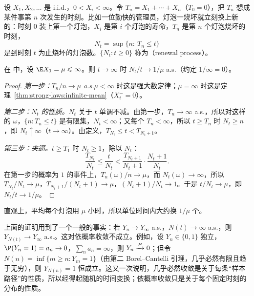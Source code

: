 
\begin{example}[更新过程]\label{ex:strong-laws:renewal}
设 $X_1,X_2,\dots$ 是 i.i.d.，$0<X_i<\infty$。令 $T_n=X_1+\cdots+X_n$（$T_0=0$），把 $T_n$ 想成某件事第 $n$ 次发生的时刻。比如一位勤快的管理员，灯泡一烧坏就立刻换上新的：时刻 $0$ 装上第一个灯泡，$X_i$ 是第 $i$ 个灯泡的寿命，$T_n$ 是第 $n$ 个灯泡烧坏的时刻，
\[
N_t=\sup\{n:\ T_n\leqslant t\}
\]
是到时刻 $t$ 为止烧坏的灯泡数。$\{N_t:t\geqslant0\}$ 称为（renewal process）。
\end{example}

\begin{theorem}[更新定理]\label{thm:strong-laws:renewal}
在 中，设 $\E X_1=\mu\leqslant\infty$。则 $t\to\infty$ 时 $N_t/t\to1/\mu$ a.s.（约定 $1/\infty=0$）。
\end{theorem}
\begin{proof}
\emph{第一步：$T_n/n\to\mu$ a.s.}$\mu<\infty$ 时这是强大数定律；$\mu=\infty$ 时这是定理~\ref{thm:strong-laws:infinite-mean}（$X_i^-=0$）。

\emph{第二步：$N_t$ 的性质。}$N_t$ 关于 $t$ 单调不减。由第一步，$T_n\to\infty$ a.s.，所以对这样的 $\omega$，$\{n:T_n\leqslant t\}$ 是有限集，$N_t<\infty$；又每个 $T_n<\infty$，所以 $t\geqslant T_n$ 时 $N_t\geqslant n$，即 $N_t\uparrow\infty$（$t\to\infty$）。由定义，$T_{N_t}\leqslant t<T_{N_t+1}$。

\emph{第三步：夹逼。}$t\geqslant T_1$ 时 $N_t\geqslant1$，除以 $N_t$：
\[
\frac{T_{N_t}}{N_t}\leqslant\frac t{N_t}<\frac{T_{N_t+1}}{N_t+1}\cdot\frac{N_t+1}{N_t}.
\]
在第一步的概率为 $1$ 的事件上，$T_n(\omega)/n\to\mu$，而 $N_t(\omega)\to\infty$，所以 $T_{N_t}/N_t\to\mu$，$T_{N_t+1}/(N_t+1)\to\mu$，$(N_t+1)/N_t\to1$。于是 $t/N_t\to\mu$，即 $N_t/t\to1/\mu$。
\end{proof}

直观上，平均每个灯泡用 $\mu$ 小时，所以单位时间内大约换 $1/\mu$ 个。

\begin{remark}[随机下标]
上面的证明用到了一个一般的事实：若 $Y_n\to Y_\infty$ a.s.，$N(t)\to\infty$ a.s.，则 $Y_{N(t)}\to Y_\infty$ a.s.。这对依概率收敛不成立。例如，设 $Y_n\in\{0,1\}$ 独立，$\P(Y_n=1)=a_n\to0$，$\sum_na_n=\infty$，则 $Y_n\xrightarrow{P}0$；但令 $N(n)=\inf\{m\geqslant n:Y_m=1\}$（由第二 Borel--Cantelli 引理，几乎必然有限且趋于无穷），则 $Y_{N(n)}=1$ 恒成立。这又一次说明，几乎必然收敛是关于每条“样本路径”的性质，所以经得起随机的时间变换；依概率收敛只是关于每个固定时刻的分布的性质。
\end{remark}

